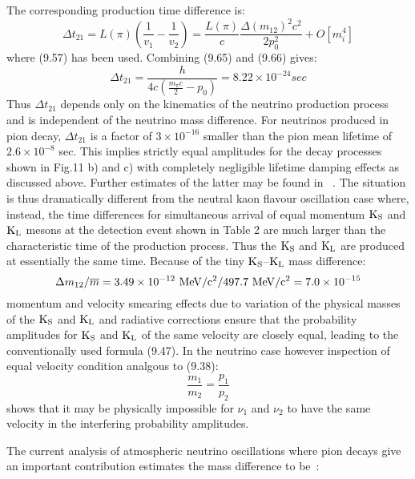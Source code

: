 { The corresponding production time difference is:
    \begin{equation}
     \Delta t_{21} =  L(\pi)\left(\frac{1}{v_1}-\frac{1}{v_2}\right) 
       = \frac{L(\pi)}{c} \frac{\Delta(m_{12})^2 c^2}{2 p_0^2}+ O[m_i^4]
     \end{equation}
     where (9.57) has been used. Combining (9.65) and (9.66) gives:
     \begin{equation}
      \Delta t_{21} = \frac{h}{4 c(\frac{m_{\pi} c}{2}-p_0)} = 8.22 \times 10^{-24} sec
      \end{equation}
 Thus $ \Delta t_{21}$ depends only on the kinematics of the neutrino production process 
   and is independent of the neutrino mass difference. For neutrinos produced in pion decay,
  $ \Delta t_{21}$ is a factor of $3 \times 10^{-16}$ smaller than the pion mean lifetime
   of $2.6 \times 10^{-8}$ sec. This implies strictly equal amplitudes for the decay processes
   shown in Fig.11 b) and c) with completely negligible lifetime damping effects as discussed 
  above. Further estimates of the latter may be found in ~\cite{JHF2}. The situation is thus
  dramatically different from the neutral kaon flavour oscillation case where, instead, the
  time differences for simultaneous arrival of equal momentum  ${\rm K_S}$ and ${\rm K_L}$ mesons
  at the detection event shown in Table 2 are much larger than the characteristic time of
  the production process. Thus the ${\rm K_S}$ and ${\rm K_L}$ are produced at essentially
  the same time. Because of the tiny ${\rm K_S}$--${\rm K_L}$ mass difference:
  \[  \Delta m_{12}/\overline{m} = 3.49 \times 10^{-12} {\rm~ MeV/c^2}/
       497.7 {\rm~ MeV/c^2} = 7.0 \times 10^{-15} \]
    momentum and velocity smearing effects due to variation of the physical masses of the
     ${\rm K_S}$ and ${\rm K_L}$ and radiative corrections ensure that the  probability amplitudes
     for  ${\rm K_S}$ and ${\rm K_L}$ of the same velocity are closely equal, leading to the 
     conventionally used formula (9.47). In the neutrino case however inspection of
      equal velocity condition analgous to (9.38):
      \begin{equation}
     \frac{m_1}{m_2} = \frac{p_1}{p_2}
      \end{equation}
   shows that it may be physically impossible for $\nu_1$ and $\nu_2$ to have the same velocity
   in the interfering probability amplitudes. 
   \par The current analysis of atmospheric neutrino oscillations where pion decays give
    an important contribution estimates the mass difference to be~\cite{Kays04}:
}
